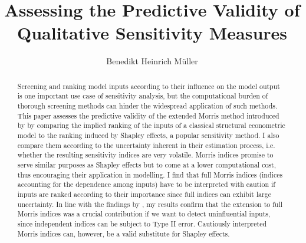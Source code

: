 \documentclass[a4paper,12pt]{article}
\begin{document}

\newpage

\thispagestyle{empty}

\title{Assessing the Predictive Validity of Qualitative Sensitivity Measures}
\author{Benedikt Heinrich Müller}
\date{}
\maketitle \thispagestyle{empty}
\begin{abstract}
	Screening and ranking model inputs according to their influence on the model output is one important use case of sensitivity analysis, but the computational burden of thorough screening methods can hinder the widespread application of such methods.
	This paper assesses the predictive validity of the extended Morris method introduced by \citet{GM17} by comparing the implied ranking of the inputs of a classical structural econometric model to the ranking induced by Shapley effects, a popular sensitivity method. I also compare them according to the uncertainty inherent in their estimation process, i.e. whether the resulting sensitivity indices are very volatile. Morris indices promise to serve similar purposes as Shapley effects but to come at a lower computational cost, thus encouraging their application in modelling.
	I find that full Morris indices (indices accounting for the dependence among inputs) have to be interpreted with caution if inputs are ranked according to their importance since full indices can exhibit large uncertainty. In line with the findings by \citet{GM17}, my results confirm that the extension to full Morris indices was a crucial contribution if we want to detect uninfluential inputs, since independent indices can be subject to Type II error.
	Cautiously interpreted Morris indices can, however, be a valid substitute for Shapley effects. %
\end{abstract}
\newpage
\end{document}
